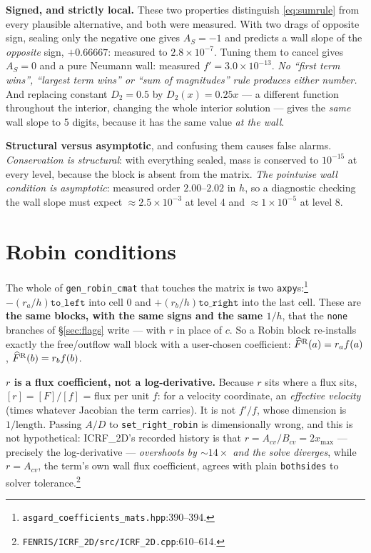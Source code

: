 \documentclass[10pt]{article}
\newcommand{\code}[1]{\texttt{#1}}
\newcommand{\hF}{\widehat{F}}
\newcommand{\fl}[2]{\texttt{#1}:#2}
\begin{document}
\textbf{Signed, and strictly local.} These two properties distinguish
\eqref{eq:sumrule} from every plausible alternative, and both were measured. With
two drags of opposite sign, sealing only the negative one gives $A_S=-1$ and
predicts a wall slope of the \emph{opposite} sign, $+0.66667$: measured to
$2.8\times10^{-7}$. Tuning them to cancel gives $A_S=0$ and a pure Neumann wall:
measured $f'=3.0\times10^{-13}$. \emph{No ``first term wins'', ``largest term
wins'' or ``sum of magnitudes'' rule produces either number.} And replacing
constant $D_2=0.5$ by $D_2(x)=0.25x$ --- a different function throughout the
interior, changing the whole interior solution --- gives the \emph{same} wall
slope to 5 digits, because it has the same value \emph{at the wall}.

\textbf{Structural versus asymptotic}, and confusing them causes false alarms.
\emph{Conservation is structural}: with everything sealed, mass is conserved to
$10^{-15}$ at every level, because the block is absent from the matrix. \emph{The
pointwise wall condition is asymptotic}: measured order $2.00$--$2.02$ in $h$, so
a diagnostic checking the wall slope must expect $\approx2.5\times10^{-3}$ at
level 4 and $\approx1\times10^{-5}$ at level 8.

\section{Robin conditions}
\label{sec:robin}

The whole of \code{gen\_robin\_cmat} that touches the matrix is two
\code{axpy}s:\footnote{\fl{asgard\_coefficients\_mats.hpp}{390--394}.}
$-(r_a/h)\code{to\_left}$ into cell $0$ and $+(r_b/h)\code{to\_right}$ into the
last cell. These are \textbf{the same blocks, with the same signs and the same
$1/h$}, that the \code{none} branches of \S\ref{sec:flags} write --- with $r$ in
place of $c$. So a Robin block re-installs exactly the free/outflow wall block
with a user-chosen coefficient: $\hF^{\rm R}(a)=r_af(a)$, $\hF^{\rm
R}(b)=r_bf(b)$.

\textbf{$r$ is a flux coefficient, not a log-derivative.} Because $r$ sits where
a flux sits, $[r]=[F]/[f]$ = flux per unit $f$: for a velocity coordinate, an
\emph{effective velocity} (times whatever Jacobian the term carries). It is not
$f'/f$, whose dimension is $1/\text{length}$. Passing $A/D$ to
\code{set\_right\_robin} is dimensionally wrong, and this is not hypothetical:
ICRF\_2D's recorded history is that $r=A_{cv}/B_{cv}=2x_{\max}$ --- precisely the
log-derivative --- \emph{overshoots by ${\sim}14\times$ and the solve diverges},
while $r=A_{cv}$, the term's own wall flux coefficient, agrees with plain
\code{bothsides} to solver
tolerance.\footnote{\code{FENRIS/ICRF\_2D/src/ICRF\_2D.cpp}:610--614.}
\end{document}
